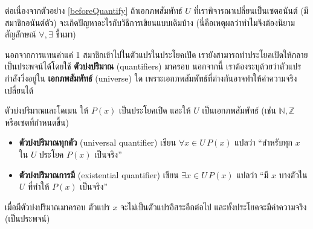 \begin{exer}
	ต่อเนื่องจากตัวอย่าง \ref{beforeQuantify} ถ้าเอกภพสัมพัทธ์ $U$ ที่เราพิจารณาเปลี่ยนเป็นเซตอนันต์ (มีสมาชิกอนันต์ตัว) จะเกิดปัญหาอะไรกับวิธีการเขียนแบบเดิมบ้าง (นี่คือเหตุผลว่าทำไมจึงต้องนิยามสัญลักษณ์  $\forall,\exists$ ขึ้นมา)
\end{exer}

นอกจากการแทนค่าแค่ 1 สมาชิกเข้าไปในตัวแปรในประโยคเปิด เรายังสามารถทำประโยคเปิดให้กลายเป็นประพจน์ได้โดยใช้ \textbf{ตัวบ่งปริมาณ} (quantifiers) มาครอบ นอกจากนี้ เราต้องระบุด้วยว่าตัวแปรกำลังวิ่งอยู่ใน \textbf{เอกภพสัมพัทธ์} (universe) ใด
เพราะเอกภพสัมพัทธ์ที่ต่างกันอาจทำให้ค่าความจริงเปลี่ยนได้

\begin{defn}{ตัวบ่งปริมาณและโดเมน}{}
	ให้ $P(x)$ เป็นประโยคเปิด และให้ $U$ เป็นเอกภพสัมพัทธ์ (เช่น $\mathbb{N},\mathbb{Z}$ หรือเซตที่กำหนดขึ้น)
	\begin{itemize}
		\item \textbf{ตัวบ่งปริมาณทุกตัว} (universal quantifier) เขียน $\forall x\in U\, P(x)$
		แปลว่า “สำหรับทุก $x$ ใน $U$ ประโยค $P(x)$ เป็นจริง”
		\item \textbf{ตัวบ่งปริมาณการมี} (existential quantifier) เขียน $\exists x\in U\, P(x)$
		แปลว่า “มี $x$ บางตัวใน $U$ ที่ทำให้ $P(x)$ เป็นจริง”
	\end{itemize}
	เมื่อมีตัวบ่งปริมาณมาครอบ ตัวแปร $x$ จะไม่เป็นตัวแปรอิสระอีกต่อไป และทั้งประโยคจะมีค่าความจริง (เป็นประพจน์)
\end{defn}

